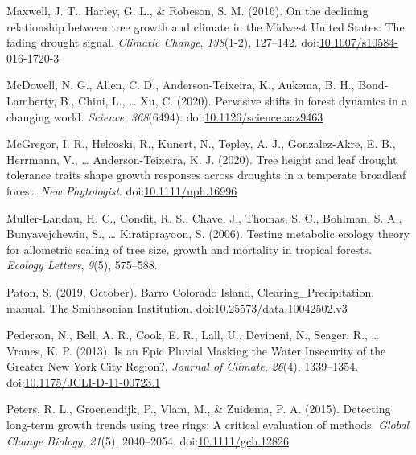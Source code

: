\documentclass[
]{article}
\newlength{\cslhangindent}
\newenvironment{cslreferences}%
  {\setlength{\parindent}{0pt}%
  \everypar{\setlength{\hangindent}{\cslhangindent}}\ignorespaces}%
  {\par}
\begin{document}
\begin{cslreferences}
\leavevmode\hypertarget{ref-maxwell_declining_2016}{}%
Maxwell, J. T., Harley, G. L., \& Robeson, S. M. (2016). On the
declining relationship between tree growth and climate in the Midwest
United States: The fading drought signal. \emph{Climatic Change},
\emph{138}(1-2), 127--142.
doi:\href{https://doi.org/10.1007/s10584-016-1720-3}{10.1007/s10584-016-1720-3}

\leavevmode\hypertarget{ref-mcdowell_pervasive_2020}{}%
McDowell, N. G., Allen, C. D., Anderson-Teixeira, K., Aukema, B. H.,
Bond-Lamberty, B., Chini, L., \ldots{} Xu, C. (2020). Pervasive shifts
in forest dynamics in a changing world. \emph{Science},
\emph{368}(6494).
doi:\href{https://doi.org/10.1126/science.aaz9463}{10.1126/science.aaz9463}

\leavevmode\hypertarget{ref-mcgregor_tree_2020}{}%
McGregor, I. R., Helcoski, R., Kunert, N., Tepley, A. J., Gonzalez-Akre,
E. B., Herrmann, V., \ldots{} Anderson-Teixeira, K. J. (2020). Tree
height and leaf drought tolerance traits shape growth responses across
droughts in a temperate broadleaf forest. \emph{New Phytologist}.
doi:\href{https://doi.org/10.1111/nph.16996}{10.1111/nph.16996}

\leavevmode\hypertarget{ref-muller-landau_testing_2006}{}%
Muller-Landau, H. C., Condit, R. S., Chave, J., Thomas, S. C., Bohlman,
S. A., Bunyavejchewin, S., \ldots{} Kiratiprayoon, S. (2006). Testing
metabolic ecology theory for allometric scaling of tree size, growth and
mortality in tropical forests. \emph{Ecology Letters}, \emph{9}(5),
575--588.

\leavevmode\hypertarget{ref-paton_barro_2019}{}%
Paton, S. (2019, October). Barro Colorado Island,
Clearing\_Precipitation, manual. The Smithsonian Institution.
doi:\href{https://doi.org/10.25573/data.10042502.v3}{10.25573/data.10042502.v3}

\leavevmode\hypertarget{ref-pederson_is_2013}{}%
Pederson, N., Bell, A. R., Cook, E. R., Lall, U., Devineni, N., Seager,
R., \ldots{} Vranes, K. P. (2013). Is an Epic Pluvial Masking the Water
Insecurity of the Greater New York City Region?, \emph{Journal of
Climate}, \emph{26}(4), 1339--1354.
doi:\href{https://doi.org/10.1175/JCLI-D-11-00723.1}{10.1175/JCLI-D-11-00723.1}

\leavevmode\hypertarget{ref-peters_detecting_2015}{}%
Peters, R. L., Groenendijk, P., Vlam, M., \& Zuidema, P. A. (2015).
Detecting long-term growth trends using tree rings: A critical
evaluation of methods. \emph{Global Change Biology}, \emph{21}(5),
2040--2054.
doi:\href{https://doi.org/10.1111/gcb.12826}{10.1111/gcb.12826}


\end{cslreferences}
\end{document}
